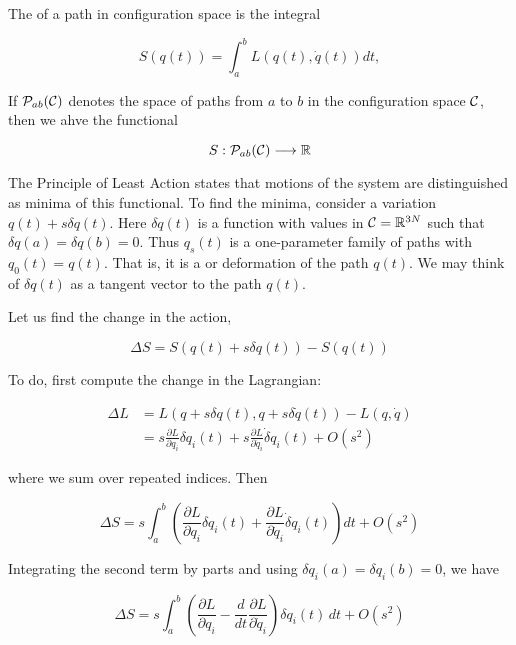 The  of a path in configuration space is the integral

\begin{equation}
S(q(t)) = \int_a^bL(q(t), \dot q(t)) dt,
\end{equation}

If $\mathcal{P}_{ab}(\mathcal{C})$ denotes the space of paths from $a$ to $b$ in 
the configuration space $\mathcal{C}$, then we ahve the functional

\begin{equation}
S: \mathcal{P}_{ab}(\mathcal{C}) \longrightarrow \mathbb{R}
\end{equation}

The Principle of Least Action states that motions of the system are distinguished as minima of this functional.  To find the minima, consider a variation $q(t) + s\delta q(t)$.  Here $\delta q(t)$ is a function with values in $\mathcal{C} = \mathbb{R}^{3N}$ such that $\delta q(a) = \delta q(b) = 0$. Thus  $q_s(t)$ is a one-parameter family of paths with $q_0(t) = q(t)$.  That is, it is a  or deformation of the path $q(t)$. We may think of $\delta q(t)$ as a tangent vector to the path $q(t)$.

Let us find the change in the action,

\begin{equation}
\Delta S = S(q(t) + s\delta q(t)) - S(q(t)) 
\end{equation}

To do, first compute the change in the Lagrangian:

\begin{align}
\Delta L &= L(q + s \delta q(t), q + s \delta \dot q(t)) - L(q, \dot q) \\
&= s\frac{\partial L}{\partial q_i}\delta q_i(t)
 + s\frac{\partial L}{\partial \dot q_i}\dot \delta q_i(t) + O(s^2)
\end{align}

where we sum over repeated indices.
Then

\begin{equation}
\Delta S = s\int_a^b\left(\frac{\partial L}{\partial q_i}\delta q_i(t)
 + \frac{\partial L}{\partial \dot q_i}\dot \delta q_i(t)\right) dt + O(s^2)
\end{equation}

Integrating the second term by parts and using $\delta q_i(a) = \delta q_i(b) = 0$, 
we have

\begin{equation}
\label{actionvariation}
\Delta S =  s\int_a^b\left(\frac{\partial L}{\partial q_i}
 - \frac{d}{dt} \frac{\partial L}{\partial \dot q_i}\right)\delta q_i(t)\, dt + O(s^2)
\end{equation}

